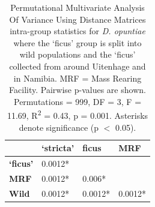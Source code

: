 \begin{table}[H]
\renewcommand{\arraystretch}{0.5}
\centering
\caption{Permutational Multivariate Analysis Of Variance Using Distance Matrices intra-group statistics for \textit{D. opuntiae} where the `ficus' group is split into wild populations and the `ficus' collected from around Uitenhage and in Namibia. MRF = Mass Rearing Facility. Pairwise p-values are shown. Permutations = 999, DF = 3, F = 11.69, R\textsuperscript{2} = 0.43, p = 0.001. Asterisks denote significance (p $<$ 0.05).}
\label{tab:adonis_stats2}
\begin{tabular}{@{}llll@{}}
\toprule
 & \textbf{`stricta'} & \textbf{ficus} & \textbf{MRF} \\ \midrule
\textbf{`ficus'} & 0.0012* & &  \\
\textbf{MRF} & 0.0012* & 0.006* &  \\
\textbf{Wild} & 0.0012* & 0.0012* & 0.0012* \\ \bottomrule
\end{tabular}
\end{table}




